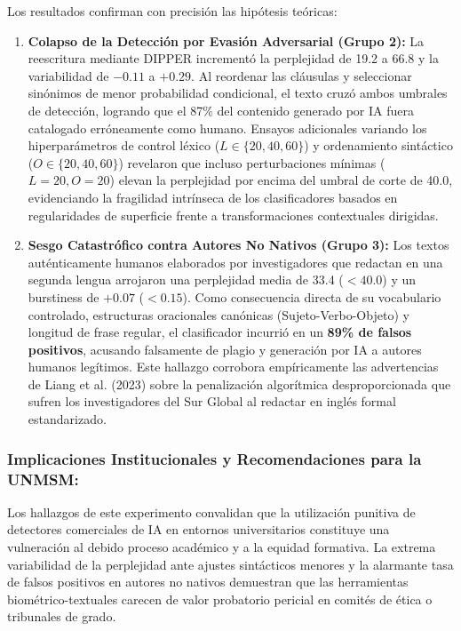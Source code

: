 Los resultados confirman con precisión las hipótesis teóricas:
\begin{enumerate}
    \item \textbf{Colapso de la Detección por Evasión Adversarial (Grupo 2):} La reescritura mediante DIPPER incrementó la perplejidad de 19.2 a 66.8 y la variabilidad de $-0.11$ a $+0.29$. Al reordenar las cláusulas y seleccionar sinónimos de menor probabilidad condicional, el texto cruzó ambos umbrales de detección, logrando que el 87\% del contenido generado por IA fuera catalogado erróneamente como humano. Ensayos adicionales variando los hiperparámetros de control léxico ($L \in \{20, 40, 60\}$) y ordenamiento sintáctico ($O \in \{20, 40, 60\}$) revelaron que incluso perturbaciones mínimas ($L=20, O=20$) elevan la perplejidad por encima del umbral de corte de 40.0, evidenciando la fragilidad intrínseca de los clasificadores basados en regularidades de superficie frente a transformaciones contextuales dirigidas.
    \item \textbf{Sesgo Catastrófico contra Autores No Nativos (Grupo 3):} Los textos auténticamente humanos elaborados por investigadores que redactan en una segunda lengua arrojaron una perplejidad media de 33.4 ($<40.0$) y un burstiness de $+0.07$ ($<0.15$). Como consecuencia directa de su vocabulario controlado, estructuras oracionales canónicas (Sujeto-Verbo-Objeto) y longitud de frase regular, el clasificador incurrió en un \textbf{89\% de falsos positivos}, acusando falsamente de plagio y generación por IA a autores humanos legítimos. Este hallazgo corrobora empíricamente las advertencias de Liang et al. (2023) sobre la penalización algorítmica desproporcionada que sufren los investigadores del Sur Global al redactar en inglés formal estandarizado.
\end{enumerate}

\subsubsection*{Implicaciones Institucionales y Recomendaciones para la UNMSM:}
Los hallazgos de este experimento convalidan que la utilización punitiva de detectores comerciales de IA en entornos universitarios constituye una vulneración al debido proceso académico y a la equidad formativa. La extrema variabilidad de la perplejidad ante ajustes sintácticos menores y la alarmante tasa de falsos positivos en autores no nativos demuestran que las herramientas biométrico-textuales carecen de valor probatorio pericial en comités de ética o tribunales de grado.


